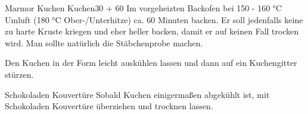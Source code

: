 \begin{MyRecipe}{Marmor Kuchen}{ Kuchen}{\SI{30}{\minuteprime} + \SI{60}{\minuteprime}}
	Im vorgeheizten Backofen bei 150 - 160 °C Umluft (180 °C Ober-/Unterhitze) ca. 60 Minuten backen. Er soll jedenfalls keine zu harte Kruste kriegen und eher heller backen, damit er auf keinen Fall trocken wird. Man sollte natürlich die Stäbchenprobe machen.
	
	Den Kuchen in der Form leicht auskühlen lassen und dann auf ein Kuchengitter stürzen.
	
	\ingredient[\Calc{0}{\x}]{\si{\gram}} {Schokoladen Kouvertüre}
	Sobald Kuchen einigermaßen abgekühlt ist, mit Schokoladen Kouvertüre überziehen und trocknen lassen.
	
\end{MyRecipe}